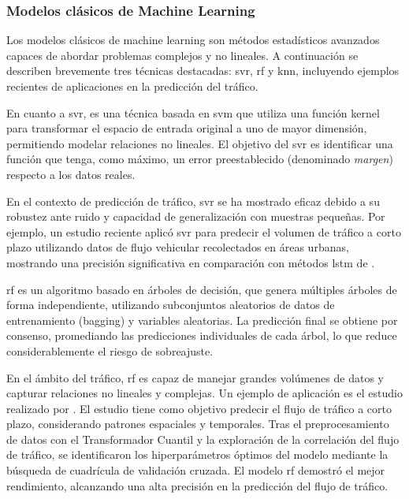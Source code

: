 \subsubsection*{Modelos clásicos de Machine Learning}

Los modelos clásicos de machine learning son métodos estadísticos avanzados capaces de abordar problemas complejos y no lineales. A continuación se describen brevemente tres técnicas destacadas: \acrlong{svr}, \acrlong{rf} y \acrlong{knn}, incluyendo ejemplos recientes de aplicaciones en la predicción del tráfico.

En cuanto a \acrfull{svr}, es una técnica basada en \acrfull{svm} que utiliza una función kernel para transformar el espacio de entrada original a uno de mayor dimensión, permitiendo modelar relaciones no lineales. El objetivo del \acrshort{svr} es identificar una función que tenga, como máximo, un error preestablecido (denominado \textit{margen}) respecto a los datos reales.

En el contexto de predicción de tráfico, \acrshort{svr} se ha mostrado eficaz debido a su robustez ante ruido y capacidad de generalización con muestras pequeñas. Por ejemplo, un estudio reciente aplicó \acrshort{svr} para predecir el volumen de tráfico a corto plazo utilizando datos de flujo vehicular recolectados en áreas urbanas, mostrando una precisión significativa en comparación con métodos \acrshort{lstm} de \cite{omar2024}.

\acrfull{rf} es un algoritmo basado en árboles de decisión, que genera múltiples árboles de forma independiente, utilizando subconjuntos aleatorios de datos de entrenamiento (bagging) y variables aleatorias. La predicción final se obtiene por consenso, promediando las predicciones individuales de cada árbol, lo que reduce considerablemente el riesgo de sobreajuste.

En el ámbito del tráfico, \acrshort{rf} es capaz de manejar grandes volúmenes de datos y capturar relaciones no lineales y complejas. Un ejemplo de aplicación es el estudio realizado por \cite{forecastRf}. El estudio tiene como objetivo predecir el flujo de tráfico a corto plazo, considerando patrones espaciales y temporales. Tras el preprocesamiento de datos con el Transformador Cuantil y la exploración de la correlación del flujo de tráfico, se identificaron los hiperparámetros óptimos del modelo mediante la búsqueda de cuadrícula de validación cruzada. El modelo \acrshort{rf} demostró el mejor rendimiento, alcanzando una alta precisión en la predicción del flujo de tráfico.


